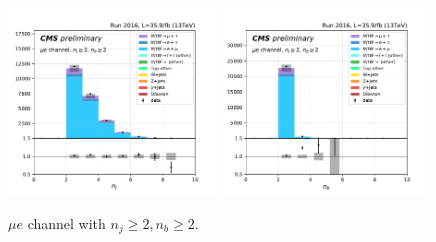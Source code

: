 \begin{figure}[ht]
    \includegraphics[width=0.49\textwidth]{chapters/Analysis/sectionPlots/figures/kinematics_pickles/emu/2b/emu_2b_nJets.pdf}
    \includegraphics[width=0.49\textwidth]{chapters/Analysis/sectionPlots/figures/kinematics_pickles/emu/2b/emu_2b_nBJets.pdf}
    
    \caption{$\mu e$ channel with $n_j\geq2, n_b\geq2$.}
\end{figure}

